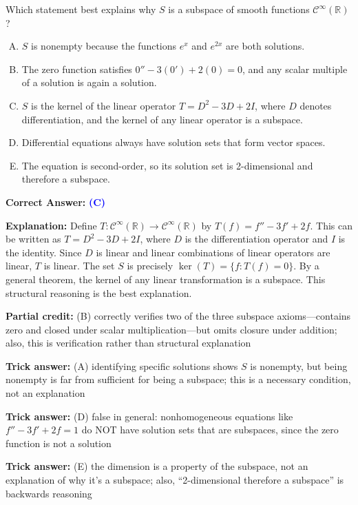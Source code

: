 \documentclass[12pt]{amsart}
\begin{document}
Which statement best explains why $S$ is a subspace of smooth functions $\mathcal{C}^\infty(\mathbb{R})$?

\begin{enumerate}[(A)]
\item $S$ is nonempty because the functions $e^x$ and $e^{2x}$ are both solutions.
\item The zero function satisfies $0'' - 3(0') + 2(0) = 0$, and any scalar multiple of a solution is again a solution.
\item $S$ is the kernel of the linear operator $T = D^2 - 3D + 2I$, where $D$ denotes differentiation, and the kernel of any linear operator is a subspace.
\item Differential equations always have solution sets that form vector spaces.
\item The equation is second-order, so its solution set is 2-dimensional and therefore a subspace.
\end{enumerate}

\textbf{Correct Answer:} \textcolor{blue}{\textbf{(C)}}

\textbf{Explanation:} Define $T: \mathcal{C}^\infty(\mathbb{R}) \to \mathcal{C}^\infty(\mathbb{R})$ by $T(f) = f'' - 3f' + 2f$. This can be written as $T = D^2 - 3D + 2I$, where $D$ is the differentiation operator and $I$ is the identity. Since $D$ is linear and linear combinations of linear operators are linear, $T$ is linear. The set $S$ is precisely $\ker(T) = \{f : T(f) = 0\}$. By a general theorem, the kernel of any linear transformation is a subspace. This structural reasoning is the best explanation.

\textbf{Partial credit:} (B) correctly verifies two of the three subspace axioms—contains zero and closed under scalar multiplication—but omits closure under addition; also, this is verification rather than structural explanation

\textbf{Trick answer:} (A) identifying specific solutions shows $S$ is nonempty, but being nonempty is far from sufficient for being a subspace; this is a necessary condition, not an explanation

\textbf{Trick answer:} (D) false in general: nonhomogeneous equations like $f'' - 3f' + 2f = 1$ do NOT have solution sets that are subspaces, since the zero function is not a solution

\textbf{Trick answer:} (E) the dimension is a property of the subspace, not an explanation of why it's a subspace; also, ``2-dimensional therefore a subspace'' is backwards reasoning
\end{document}
